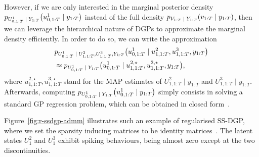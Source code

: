 However, if we are only interested in the marginal posterior density $p_{U^1_{0, 1:T} {\;|\;} Y_{1:T}}\big(u^1_{0, 1:T} {\;|\;} y_{1:T}\big)$ instead of the full density $p_{V_{1:T} {\;|\;} Y_{1:T}}(v_{1:T} {\;|\;} y_{1:T})$, then we can leverage the hierarchical nature of DGPs to approximate the marginal density efficiently. In order to do so, we can write the approximation
\begin{equation}
	\begin{split}
		&p_{U^1_{0, 1:T} {\;|\;} U^2_{1, 1:T}, U^3_{1, 1:T}, Y_{1:T}}\big(u^1_{0, 1:T} {\;|\;} u^2_{1, 1:T}, u^3_{1, 1:T}, y_{1:T}\big) \\
		&\approx p_{U^{1}_{0, 1:T} {\;|\;} Y_{1:T}}\big(u^1_{0, 1:T} {\;|\;} u^{2, \star}_{1, 1:T}, u^{3, \star}_{1, 1:T}, y_{1:T}\big),
		\label{equ:r-ssdgp-uncertainty}
	\end{split}
\end{equation}
where $u^{2, \star}_{1, 1:T}, u^{3, \star}_{1, 1:T}$ stand for the MAP estimates of $U^{2}_{1, 1:T}\mid y_{1:T}$ and $U^{3}_{1, 1:T} \mid y_{1:T}$. Afterwards, computing $p_{U^1_{0, 1:T} {\;|\;} Y_{1:T}}\big(u^1_{0, 1:T} {\;|\;} y_{1:T}\big)$ simply consists in solving a standard GP regression problem, which can be obtained in closed form~\citep{Zhao2021RSSGP}.

Figure~\ref{fig:r-ssdgp-admm} illustrates such an example of regularised SS-DGP, where we set the sparsity inducing matrices to be identity matrices~\citep{Zhao2021RSSGP}. The latent states $U^2_1$ and $U^3_1$ exhibit spiking behaviours, being almost zero except at the two discontinuities.
